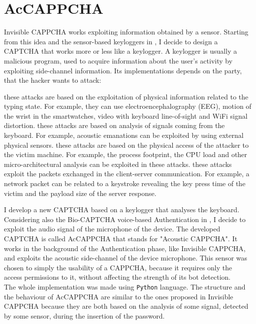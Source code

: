 \chapter{AcCAPPCHA}\label{chapter:AcCAPPCHA}
Invisible CAPPCHA works exploiting information obtained by a sensor. Starting from this idea and the sensor-based keyloggers in , I decide to design a CAPTCHA that works more or less like a keylogger. A keylogger is usually a malicious program, used to acquire information about the user's activity by exploiting side-channel information. Its implementations depends on the party, that the hacker wants to attack\cite{keylogging}:
\begin{itemize}
{these attacks are based on the exploitation of physical information related to the typing state. For example, they can use electroencephalography (EEG), motion of the wrist in the smartwatches, video with keyboard line-of-sight and WiFi signal distortion.}
{these attacks are based on analysis of signals coming from the keyboard. For example, acoustic emanations can be exploited by using external physical sensors.}
{these attacks are based on the physical access of the attacker to the victim machine. For example, the process footprint, the CPU load and other micro-architectural analysis can be exploited in these attacks.}
{these attacks exploit the packets exchanged in the client-server communication. For example, a network packet can be related to a keystroke revealing the key press time of the victim and the payload size of the server response.}
\end{itemize}
I develop a new CAPTCHA based on a keylogger that analyses the keyboard. Considering also the Bio-CAPTCHA voice-based Authentication in , I decide to exploit the audio signal of the microphone of the device. The developed CAPTCHA is called AcCAPPCHA that stands for "Acoustic CAPPCHA". It works in the background of the Authentication phase, like Invisible CAPPCHA, and exploits the acoustic side-channel of the device microphone.
This sensor was chosen to simply the usability of a CAPPCHA, because it requires only the access permissions to it, without affecting the strength of its bot detection.\\
The whole implementation was made using \texttt{Python} language. The structure and the behaviour of AcCAPPCHA are similar to the ones proposed in Invisible CAPPCHA because they are both based on the analysis of some signal, detected by some sensor, during the insertion of the password.\\
